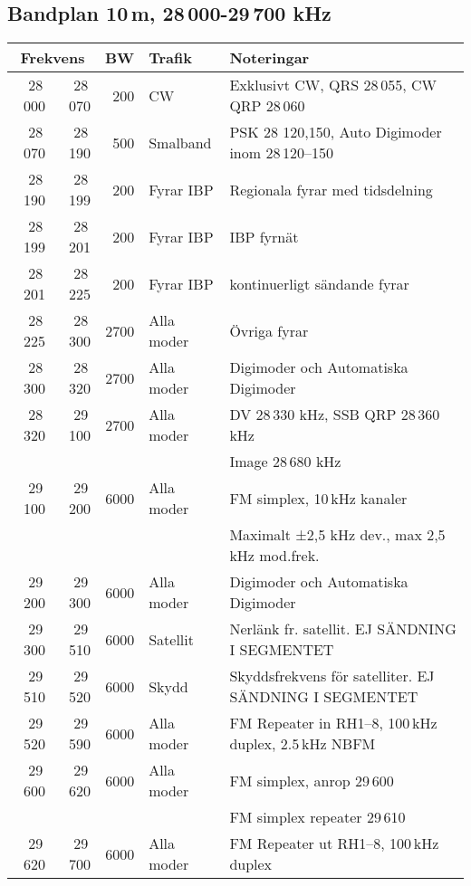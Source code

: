 \small
\subsection{Bandplan 10\,m, 28\,000-29\,700 kHz}
\begin{tabular}{rrrll}
\multicolumn{2}{c}{\textbf{Frekvens}} & \textbf{BW} & \textbf{Trafik} & \textbf{Noteringar} \\ \hline
28\,000 & 28\,070 & 200  & CW         & Exklusivt CW, QRS 28\,055, CW QRP 28\,060              \\ \hline
28\,070 & 28\,190 & 500  & Smalband   & PSK 28 120,150, Auto Digimoder inom 28\,120--150       \\ \hline
28\,190 & 28\,199 & 200  & Fyrar IBP  & Regionala fyrar med tidsdelning                        \\ \hline
28\,199 & 28\,201 & 200  & Fyrar IBP  & IBP fyrnät                                             \\ \hline
28\,201 & 28\,225 & 200  & Fyrar IBP  & kontinuerligt sändande fyrar                           \\ \hline
28\,225 & 28\,300 & 2700 & Alla moder & Övriga fyrar                                           \\ \hline
28\,300 & 28\,320 & 2700 & Alla moder & Digimoder och Automatiska Digimoder                    \\ \hline
28\,320 & 29\,100 & 2700 & Alla moder & DV 28\,330 kHz, SSB QRP 28\,360 kHz                    \\
        &         &      &            & Image 28\,680 kHz                                      \\ \hline
29\,100 & 29\,200 & 6000 & Alla moder & FM simplex, 10\,kHz kanaler                            \\
        &         &      &            & Maximalt ±2,5 kHz dev., max 2,5\,kHz mod.frek.         \\ \hline
29\,200 & 29\,300 & 6000 & Alla moder & Digimoder och Automatiska Digimoder                    \\ \hline
29\,300 & 29\,510 & 6000 & Satellit   & Nerlänk fr. satellit. EJ SÄNDNING I SEGMENTET          \\ \hline
29\,510 & 29\,520 & 6000 & Skydd      & Skyddsfrekvens för satelliter. EJ SÄNDNING I SEGMENTET \\ \hline
29\,520 & 29\,590 & 6000 & Alla moder & FM Repeater in RH1--8, 100\,kHz duplex, 2.5\,kHz NBFM  \\ \hline
29\,600 & 29\,620 & 6000 & Alla moder & FM simplex, anrop 29\,600                              \\
        &         &      &            & FM simplex repeater 29\,610                            \\ \hline
29\,620 & 29\,700 & 6000 & Alla moder & FM Repeater ut RH1--8, 100\,kHz duplex                 \\ \hline
\end{tabular}
\normalsize

